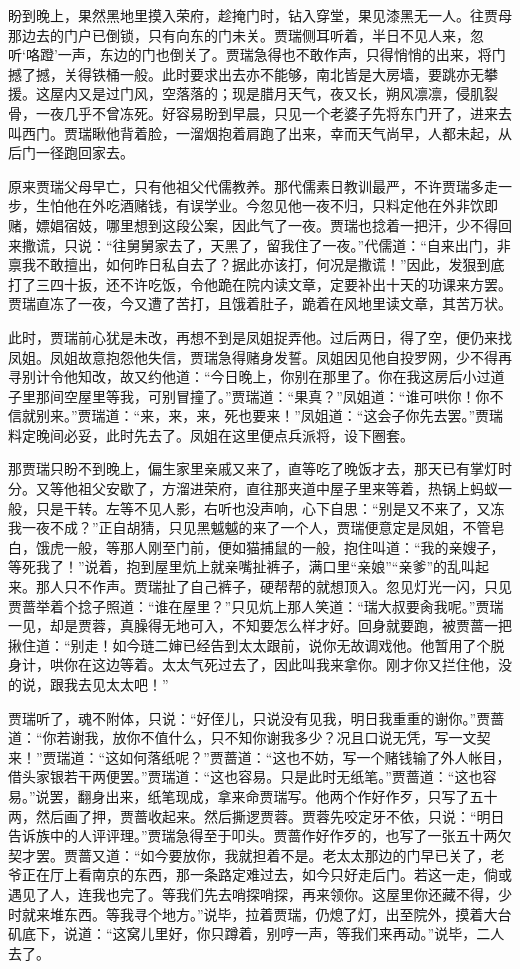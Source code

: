 \documentclass[12pt,oneside]{book}
\begin{document}
盼到晚上，果然黑地里摸入荣府，趁掩门时，钻入穿堂，果见漆黑无一人。往贾母那边去的门户已倒锁，只有向东的门未关。贾瑞侧耳听着，半日不见人来，忽听‘咯蹬’一声，东边的门也倒关了。贾瑞急得也不敢作声，只得悄悄的出来，将门撼了撼，关得铁桶一般。此时要求出去亦不能够，南北皆是大房墙，要跳亦无攀援。这屋内又是过门风，空落落的；现是腊月天气，夜又长，朔风凛凛，侵肌裂骨，一夜几乎不曾冻死。好容易盼到早晨，只见一个老婆子先将东门开了，进来去叫西门。贾瑞瞅他背着脸，一溜烟抱着肩跑了出来，幸而天气尚早，人都未起，从后门一径跑回家去。

原来贾瑞父母早亡，只有他祖父代儒教养。那代儒素日教训最严，不许贾瑞多走一步，生怕他在外吃酒赌钱，有误学业。今忽见他一夜不归，只料定他在外非饮即赌，嫖娼宿妓，哪里想到这段公案，因此气了一夜。贾瑞也捻着一把汗，少不得回来撒谎，只说：“往舅舅家去了，天黑了，留我住了一夜。”代儒道：“自来出门，非禀我不敢擅出，如何昨日私自去了？据此亦该打，何况是撒谎！”因此，发狠到底打了三四十扳，还不许吃饭，令他跪在院内读文章，定要补出十天的功课来方罢。贾瑞直冻了一夜，今又遭了苦打，且饿着肚子，跪着在风地里读文章，其苦万状。

此时，贾瑞前心犹是未改，再想不到是凤姐捉弄他。过后两日，得了空，便仍来找凤姐。凤姐故意抱怨他失信，贾瑞急得赌身发誓。凤姐因见他自投罗网，少不得再寻别计令他知改，故又约他道：“今日晚上，你别在那里了。你在我这房后小过道子里那间空屋里等我，可别冒撞了。”贾瑞道：“果真？”凤姐道：“谁可哄你！你不信就别来。”贾瑞道：“来，来，来，死也要来！”凤姐道：“这会子你先去罢。”贾瑞料定晚间必妥，此时先去了。凤姐在这里便点兵派将，设下圈套。

那贾瑞只盼不到晚上，偏生家里亲戚又来了，直等吃了晚饭才去，那天已有掌灯时分。又等他祖父安歇了，方溜进荣府，直往那夹道中屋子里来等着，热锅上蚂蚁一般，只是干转。左等不见人影，右听也没声响，心下自思：“别是又不来了，又冻我一夜不成？”正自胡猜，只见黑魆魆的来了一个人，贾瑞便意定是凤姐，不管皂白，饿虎一般，等那人刚至门前，便如猫捕鼠的一般，抱住叫道：“我的亲嫂子，等死我了！”说着，抱到屋里炕上就亲嘴扯裤子，满口里“亲娘”“亲爹”的乱叫起来。那人只不作声。贾瑞扯了自己裤子，硬帮帮的就想顶入。忽见灯光一闪，只见贾蔷举着个捻子照道：“谁在屋里？”只见炕上那人笑道：“瑞大叔要肏我呢。”贾瑞一见，却是贾蓉，真臊得无地可入，不知要怎么样才好。回身就要跑，被贾蔷一把揪住道：“别走！如今琏二婶已经告到太太跟前，说你无故调戏他。他暂用了个脱身计，哄你在这边等着。太太气死过去了，因此叫我来拿你。刚才你又拦住他，没的说，跟我去见太太吧！”

贾瑞听了，魂不附体，只说：“好侄儿，只说没有见我，明日我重重的谢你。”贾蔷道：“你若谢我，放你不值什么，只不知你谢我多少？况且口说无凭，写一文契来！”贾瑞道：“这如何落纸呢？”贾蔷道：“这也不妨，写一个赌钱输了外人帐目，借头家银若干两便罢。”贾瑞道：“这也容易。只是此时无纸笔。”贾蔷道：“这也容易。”说罢，翻身出来，纸笔现成，拿来命贾瑞写。他两个作好作歹，只写了五十两，然后画了押，贾蔷收起来。然后撕逻贾蓉。贾蓉先咬定牙不依，只说：“明日告诉族中的人评评理。”贾瑞急得至于叩头。贾蔷作好作歹的，也写了一张五十两欠契才罢。贾蔷又道：“如今要放你，我就担着不是。老太太那边的门早已关了，老爷正在厅上看南京的东西，那一条路定难过去，如今只好走后门。若这一走，倘或遇见了人，连我也完了。等我们先去哨探哨探，再来领你。这屋里你还藏不得，少时就来堆东西。等我寻个地方。”说毕，拉着贾瑞，仍熄了灯，出至院外，摸着大台矶底下，说道：“这窝儿里好，你只蹲着，别哼一声，等我们来再动。”说毕，二人去了。
\end{document}
